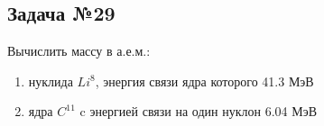 \subsection{Задача №29}

Вычислить массу в а.е.м.:

\begin{enumerate}
	\item нуклида $Li^8$, энергия связи ядра которого 41.3 МэВ
	\item ядра $C^{11}$ c энергией связи на один нуклон 6.04 МэВ	
\end{enumerate}